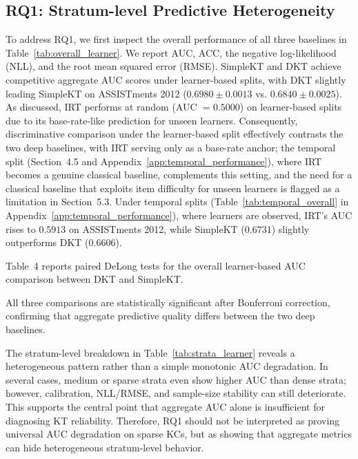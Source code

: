 \subsection{RQ1: Stratum-level Predictive Heterogeneity}
To address RQ1, we first inspect the overall performance of all three baselines in Table~\ref{tab:overall_learner}. We report AUC, ACC, the negative log-likelihood (NLL), and the root mean squared error (RMSE). SimpleKT and DKT achieve competitive aggregate AUC scores under learner-based splits, with DKT slightly leading SimpleKT on ASSISTments 2012 ($0.6980 \pm 0.0013$ vs. $0.6840 \pm 0.0025$). As discussed, IRT performs at random (AUC $= 0.5000$) on learner-based splits due to its base-rate-like prediction for unseen learners. Consequently, discriminative comparison under the learner-based split effectively contrasts the two deep baselines, with IRT serving only as a base-rate anchor; the temporal split (Section~4.5 and Appendix~\ref{app:temporal_performance}), where IRT becomes a genuine classical baseline, complements this setting, and the need for a classical baseline that exploits item difficulty for unseen learners is flagged as a limitation in Section~5.3. Under temporal splits (Table~\ref{tab:temporal_overall} in Appendix~\ref{app:temporal_performance}), where learners are observed, IRT's AUC rises to $0.5913$ on ASSISTments 2012, while SimpleKT ($0.6731$) slightly outperforms DKT ($0.6606$).





Table~4 reports paired DeLong tests for the overall learner-based AUC comparison between DKT and SimpleKT.

All three comparisons are statistically significant after Bonferroni correction, confirming that aggregate predictive quality differs between the two deep baselines.

The stratum-level breakdown in Table~\ref{tab:strata_learner} reveals a heterogeneous pattern rather than a simple monotonic AUC degradation. In several cases, medium or sparse strata even show higher AUC than dense strata; however, calibration, NLL/RMSE, and sample-size stability can still deteriorate. This supports the central point that aggregate AUC alone is insufficient for diagnosing KT reliability. Therefore, RQ1 should not be interpreted as proving universal AUC degradation on sparse KCs, but as showing that aggregate metrics can hide heterogeneous stratum-level behavior.

